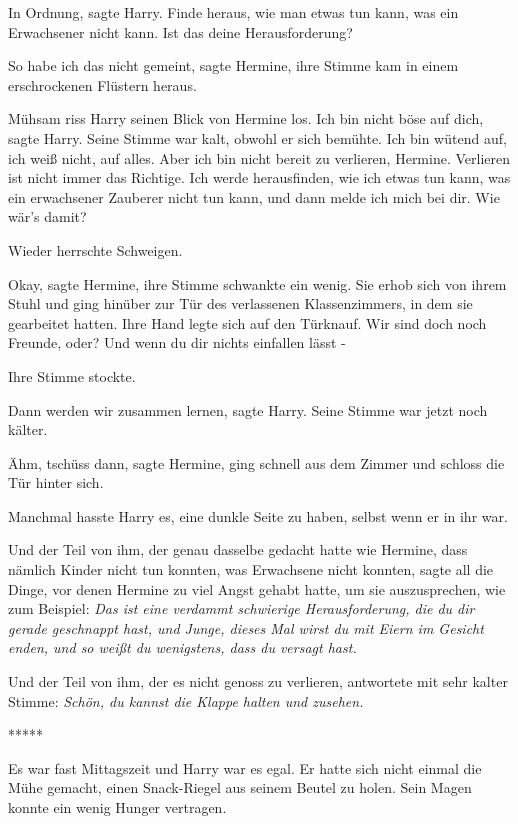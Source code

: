\glqq{}In Ordnung\grqq{}, sagte Harry. \glqq{}Finde heraus, wie man etwas tun
kann, was ein Erwachsener nicht kann. Ist das deine Herausforderung?\grqq{}

\glqq{}So habe ich das nicht gemeint\grqq{}, sagte Hermine, ihre Stimme kam in
einem erschrockenen Flüstern heraus.

Mühsam riss Harry seinen Blick von Hermine los. \glqq{}Ich bin nicht böse auf
dich\grqq{}, sagte Harry. Seine Stimme war kalt, obwohl er sich bemühte. \glqq{}
Ich bin wütend auf, ich weiß nicht, auf alles. Aber ich bin nicht bereit zu
verlieren, Hermine. Verlieren ist nicht immer das Richtige. Ich werde
herausfinden, wie ich etwas tun kann, was ein erwachsener Zauberer nicht tun
kann, und dann melde ich mich bei dir. Wie wär's damit?\grqq{}

Wieder herrschte Schweigen.

\glqq{}Okay\grqq{}, sagte Hermine, ihre Stimme schwankte ein wenig. Sie erhob
sich von ihrem Stuhl und ging hinüber zur Tür des verlassenen Klassenzimmers, in
dem sie gearbeitet hatten. Ihre Hand legte sich auf den Türknauf. \glqq{}Wir
sind doch noch Freunde, oder? Und wenn du dir nichts einfallen lässt -\grqq{}

Ihre Stimme stockte.

\glqq{}Dann werden wir zusammen lernen\grqq{}, sagte Harry. Seine Stimme war
jetzt noch kälter.

\glqq{}Ähm, tschüss dann\grqq{}, sagte Hermine, ging schnell aus dem Zimmer und
schloss die Tür hinter sich.

Manchmal hasste Harry es, eine dunkle Seite zu haben, selbst wenn er in ihr war.

Und der Teil von ihm, der genau dasselbe gedacht hatte wie Hermine, dass nämlich
Kinder nicht tun konnten, was Erwachsene nicht konnten, sagte all die Dinge, vor
denen Hermine zu viel Angst gehabt hatte, um sie auszusprechen, wie zum
Beispiel: \emph{Das ist eine verdammt schwierige Herausforderung, die du dir
gerade geschnappt hast, und Junge, dieses Mal wirst du mit Eiern im Gesicht
enden, und so weißt du wenigstens, dass du versagt hast.}

Und der Teil von ihm, der es nicht genoss zu verlieren, antwortete mit sehr
kalter Stimme: \emph{Schön, du kannst die Klappe halten und zusehen.}

\begin{center}*****\end{center}

Es war fast Mittagszeit und Harry war es egal. Er hatte sich nicht einmal die
Mühe gemacht, einen Snack-Riegel aus seinem Beutel zu holen. Sein Magen konnte
ein wenig Hunger vertragen.


